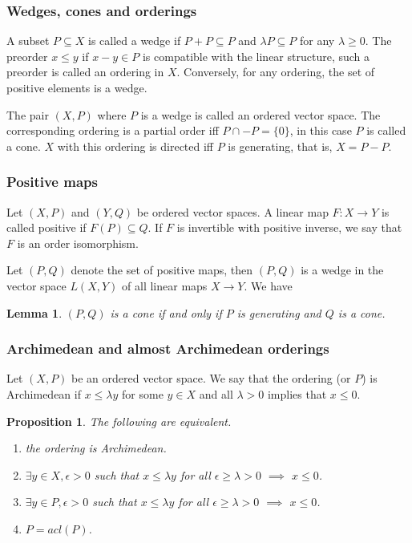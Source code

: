 \documentclass[12pt]{article}
\newtheorem{lemma}{Lemma}
\newtheorem{prop}{Proposition}
\theoremstyle{remark}
\newcommand{\<}{\langle}
\begin{document}

\subsubsection*{Wedges, cones and orderings}

A subset $P\subseteq X$ is called a  wedge if $P+P\subseteq P$ and $\lambda P\subseteq P$ for any $\lambda\ge 0$. The preorder $x\le y$ if $x-y\in P$ is compatible with the linear structure, such a preorder is called an ordering in $X$. Conversely, for any ordering, the set of positive elements  is a wedge.

The pair $(X,P)$ where $P$ is a wedge is called an ordered vector space. 
The corresponding ordering is a partial order iff $P\cap -P=\{0\}$, in this case $P$ is called a cone. 
$X$ with this ordering is directed  iff $P$ is generating, that is,  $X=P-P$. 

\subsubsection*{Positive maps}

Let $(X,P)$ and $(Y,Q)$ be ordered vector spaces. A  linear map $F:X\to Y$ is called positive if $F(P)\subseteq Q$. If $F$ is invertible with positive inverse, we say that $F$ is an order isomorphism.

 Let  $(P,Q)$ denote the set of positive maps, then $(P,Q)$ is a wedge in the vector space $L(X,Y)$ of all linear maps $X\to Y$. We have

\begin{lemma}\label{lemma:duality_morph} $(P,Q)$ is a cone if and only if $P$ is generating and $Q$ is a cone.

\end{lemma}

\subsubsection*{Archimedean and almost Archimedean orderings}

Let $(X,P)$ be an ordered vector space. We say that the ordering (or $P$) is Archimedean if 
 $x\le \lambda y$ for some $y\in X$ and all $\lambda> 0$ implies that $x\le 0$. 
\begin{prop}
The following are equivalent.
\begin{enumerate}
\item[(i)] the ordering is Archimedean.
\item[(ii)]  $\exists y\in X, \epsilon >0$ such that  $x\le \lambda y$ for all $\epsilon\ge \lambda>0$ $\implies$ $x\le 0$.
\item[(iii)] $\exists y\in P, \epsilon >0$ such that  $x\le \lambda y$ for all $\epsilon\ge \lambda>0$ $\implies$ $x\le 0$.
\item[(iv)] $P=acl(P)$.
\end{enumerate}
\end{prop}
\end{document}
